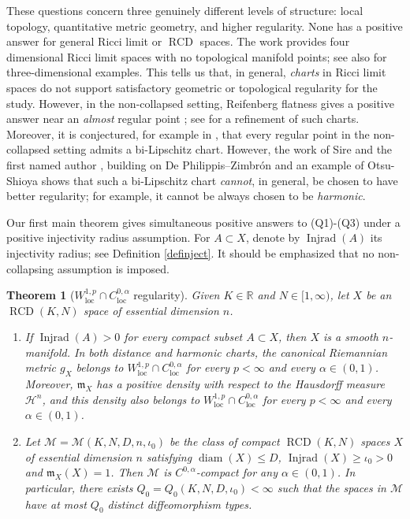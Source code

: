 \documentclass[11pt,reqno]{amsart}
\newtheorem{theorem}{Theorem}[section]
\theoremstyle{definition}
\numberwithin{equation}{section}
\newcommand{\dR}{\mathbb{R}}
\newcommand{\fm}{\mathfrak{m}}
\newcommand{\meas}{\mathfrak{m}}
\DeclareMathOperator{\diam}{diam}
\DeclareMathOperator{\Injrad}{Injrad}
\DeclareMathOperator{\loc}{loc}
\DeclareMathOperator{\RCD}{RCD}
\newcommand{\haus}{\mathscr{H}}
\begin{document}
These questions concern three genuinely different levels of structure: local topology, quantitative metric geometry, and higher regularity. None has a positive answer for general Ricci limit or $\RCD$ spaces. 
  The work \cite{HNW} provides four dimensional Ricci limit spaces with no topological manifold points; see also \cite{Zhou}  for three-dimensional examples. This tells us that, in general, \textit{charts} in Ricci limit spaces do not support satisfactory geometric or topological regularity for the study. However, in the non-collapsed setting, Reifenberg flatness gives a positive answer near an \textit{almost} regular point \cite{Cheeger-Colding-III, KM}; see \cite{BNS} for a refinement of such charts.      Moreover, it is conjectured, for example in \cite{CheegerColding1}, that every regular point in the non-collapsed setting admits a bi-Lipschitz chart. However, the work of Sire  and the first named author \cite{HS}, building on De Philippis–Zimbr{\'o}n \cite{DZ} and an example of Otsu-Shioya \cite{OS} shows that such a bi-Lipschitz chart \textit{cannot}, in general, be chosen to have better regularity; for example, it cannot be always chosen to be \textit{harmonic}.


Our first main theorem gives simultaneous positive answers to (Q1)-(Q3) under a positive injectivity radius assumption. For  $A \subset X$, denote by $\Injrad(A)$ its injectivity radius; see Definition \ref{definject}. It should be emphasized that no non-collapsing assumption is imposed.

\begin{theorem}[$W^{1,p}_{\loc}\cap C^{0,\alpha}_{\loc}$ regularity]\label{theorem:inj} 
Given $K\in\dR$ and $N \in [1, \infty)$, let $X$ be an $\RCD(K, N)$ space of essential dimension $n$.
\begin{enumerate}
\item If $\Injrad(A)  > 0$ for every compact subset $A \subset X$, then $X$ is a smooth $n$-manifold. In both distance and harmonic charts, the canonical Riemannian metric $g_X$ belongs to $W^{1,p}_{\loc} \cap C^{0,\alpha}_{\loc}$ for every $p<\infty$ and every $\alpha \in (0,1)$. Moreover, $\meas_X$ has a positive density with respect to the Hausdorff measure $\haus^n$, and this density also belongs to $W^{1,p}_{\loc} \cap C^{0,\alpha}_{\loc}$ for every $p<\infty$ and every $\alpha \in (0,1)$.



\item 
Let $\mathcal{M}=\mathcal{M}(K, N, D, n, \iota_0)$ be the class of compact $\RCD(K, N)$ spaces $X$ of essential dimension $n$ satisfying 
$
\diam(X) \leq  D$, $\Injrad(X) \geq \iota_0 > 0$ and $\fm_X(X) = 1$. Then $\mathcal{M}$
is  $C^{0,\alpha}$-compact for any $\alpha\in (0, 1)$. In particular, there exists $Q_0 = Q_0 (K, N, D, \iota_0) < \infty$ such that the spaces in $\mathcal{M}$ have at most 
 $Q_0$ distinct diffeomorphism types.
\end{enumerate}
\end{theorem} 
\end{document}
